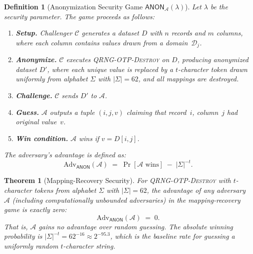 \documentclass[journal]{IEEEtran}
\newtheorem{theorem}{Theorem}
\newtheorem{definition}{Definition}
\begin{document}
\begin{definition}[Anonymization Security Game $\mathsf{ANON}_{\mathcal{A}}(\lambda)$]
\label{def:anon-game}
Let $\lambda$ be the security parameter. The game proceeds as follows:
\begin{enumerate}
\item \textbf{Setup.} Challenger $\mathcal{C}$ generates a dataset $D$ with $n$ records and $m$ columns, where each column contains values drawn from a domain~$\mathcal{D}_j$.
\item \textbf{Anonymize.} $\mathcal{C}$ executes \textsc{QRNG-OTP-Destroy} on $D$, producing anonymized dataset $D'$, where each unique value is replaced by a $t$-character token drawn uniformly from alphabet $\Sigma$ with $|\Sigma| = 62$, and all mappings are destroyed.
\item \textbf{Challenge.} $\mathcal{C}$ sends $D'$ to $\mathcal{A}$.
\item \textbf{Guess.} $\mathcal{A}$ outputs a tuple $(i, j, v)$ claiming that record~$i$, column~$j$ had original value~$v$.
\item \textbf{Win condition.} $\mathcal{A}$ wins if $v = D[i,j]$.
\end{enumerate}
The adversary's advantage is defined as:
\begin{equation}
\mathrm{Adv}_{\mathsf{ANON}}(\mathcal{A}) \;=\; \Pr[\mathcal{A}\text{ wins}] \;-\; |\Sigma|^{-t}.
\label{eq:adv-anon}
\end{equation}
\end{definition}

\begin{theorem}[Mapping-Recovery Security]
\label{thm:game-security}
For \textsc{QRNG-OTP-Destroy} with $t$-character tokens from alphabet $\Sigma$ with $|\Sigma| = 62$, the advantage of any adversary $\mathcal{A}$ (including computationally unbounded adversaries) in the mapping-recovery game is exactly zero:
\begin{equation}
\mathrm{Adv}_{\mathsf{ANON}}(\mathcal{A}) \;=\; 0.
\label{eq:adv-bound}
\end{equation}
That is, $\mathcal{A}$ gains no advantage over random guessing. The absolute winning probability is $|\Sigma|^{-t} = 62^{-16} \approx 2^{-95.3}$, which is the baseline rate for guessing a uniformly random $t$-character string.
\end{theorem}
\end{document}

